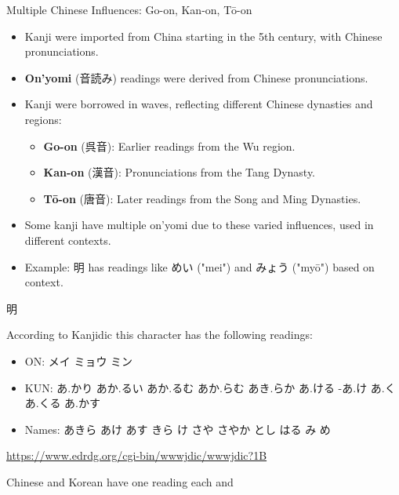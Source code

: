 \documentclass[xetex]{beamer}
\newcommand{\ko}{\mtciteform}
\newcommand{\zh}{\mtciteform}
\begin{document}
\begin{frame}{Multiple Chinese Influences: Go-on, Kan-on, Tō-on}
\begin{itemize}

    \item Kanji were imported from China starting in the 5th century, with Chinese pronunciations.
    \item \textbf{On’yomi} (\textjapanese{音読み}) readings were derived from Chinese pronunciations.
    \item Kanji were borrowed in waves, reflecting different Chinese dynasties and regions:
    \begin{itemize}
        \item \textbf{Go-on} (\textjapanese{呉音}): Earlier readings from the Wu region.
        \item \textbf{Kan-on} (\textjapanese{漢音}): Pronunciations from the Tang Dynasty.
        \item \textbf{Tō-on} (\textjapanese{唐音}): Later readings from the Song and Ming Dynasties.
    \end{itemize}
    \item Some kanji have multiple on’yomi due to these varied influences, used in different contexts.
    \item Example: \textjapanese{明} has readings like \textjapanese{めい} ("mei") and \textjapanese{みょう} ("myō") based on context.
\end{itemize}
\end{frame}

\begin{frame}{\textjapanese{明}}

  According to Kanjidic this character has the following readings:
  \begin{itemize}
  \item ON:  \textjapanese{メイ ミョウ ミン}
  \item KUN: \textjapanese{あ.かり あか.るい あか.るむ あか.らむ あき.らか あ.ける -あ.け あ.く あ.くる あ.かす}
  \item Names: \textjapanese{あきら あけ あす きら け さや さやか とし はる み め} 
  \end{itemize}
  
  \url{https://www.edrdg.org/cgi-bin/wwwjdic/wwwjdic?1B}

  Chinese and Korean have one reading each \zh{ming2} and \ko{myeong}
  
\end{frame}
\end{document}
